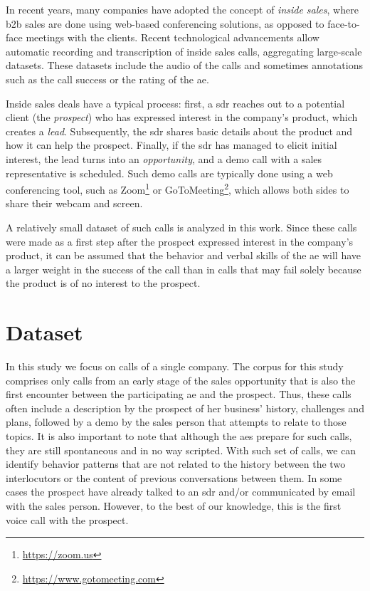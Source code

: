 In recent years, many companies have adopted the concept of \emph{inside sales}, where \ac{b2b} sales are
done using web-based conferencing solutions, as opposed to face-to-face meetings with the clients.
Recent technological advancements allow automatic recording and transcription of inside sales calls, aggregating large-scale datasets.
These datasets include the audio of the calls and sometimes annotations such as the call success or the rating of the \ac{ae}.

Inside sales deals have a typical process:
first, a \ac{sdr} reaches out to a potential client (the \emph{prospect}) who has expressed interest in the company's product, which creates a \emph{lead}.
Subsequently, the \ac{sdr} shares basic details about the product and how it can help the prospect.
Finally, if the \ac{sdr} has managed to elicit initial interest, the lead turns into an \emph{opportunity}, and a demo call with a sales representative is scheduled.
Such demo calls are typically done using a web conferencing tool, such as Zoom\footnote{\url{https://zoom.us}} or GoToMeeting\footnote{\url{https://www.gotomeeting.com}}, which allows both sides to share their webcam and screen.

A relatively small dataset of such calls is analyzed in this work.
Since these calls were made as a first step after the prospect expressed interest in the company's product, it can be assumed that the behavior and verbal skills of the \ac{ae} will have a  larger weight in the success of the call than in calls that may fail solely because the product is of no interest to the prospect.

\section{Dataset}
\label{sec:dataset}

In this study we focus on calls of a single company.
The corpus for this study comprises only calls from an early stage of the sales opportunity that is also the first encounter between the participating \ac{ae} and the prospect.
Thus, these calls often include a description by the prospect of her business' history, challenges and plans, followed by a demo by the sales person that attempts to relate to those topics.
It is also important to note that although the \acp{ae} prepare for such calls, they are still spontaneous and in no way scripted.
With such set of calls, we can identify behavior patterns that are not related to the history between the two interlocutors or the content of previous conversations between them.
In some cases the prospect have already talked to an \ac{sdr} and/or communicated by email with the sales person.
However, to the best of our knowledge, this is the first voice call with the prospect.

